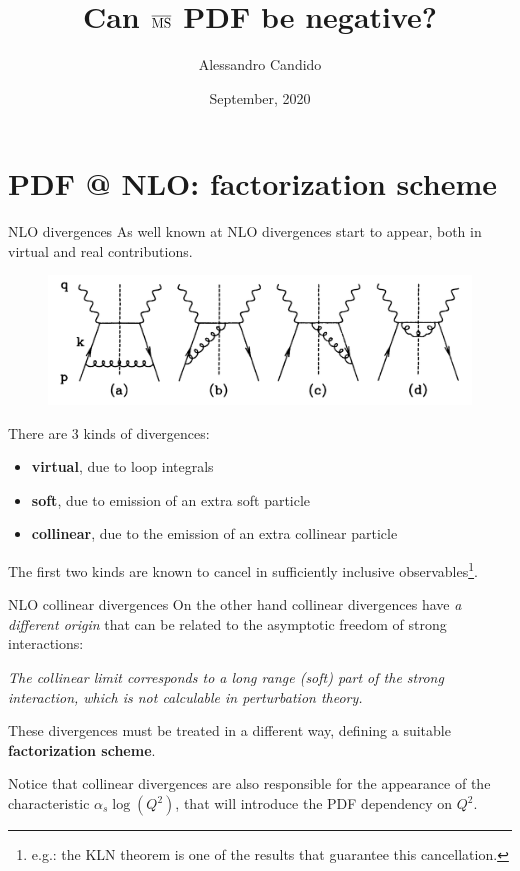 \documentclass[8pt]{beamer}
\title{Can $\operatorname{\overline{MS}}$ PDF be negative?}
\date{September, 2020}
\author{Alessandro Candido
}
\begin{document}
\maketitle

\section{PDF @ NLO: factorization scheme}
\begin{frame}{NLO divergences}
    As well known at NLO divergences start to appear, both in virtual and real contributions.
    \begin{figure}
        \centering
        \includegraphics[width=.8\textwidth]{pictures/nlo-real}
    \end{figure}
    There are 3 kinds of divergences:
    \begin{itemize}
        \item \textbf{virtual}, due to loop integrals
        \item \textbf{soft}, due to emission of an extra soft particle
        \item \textbf{collinear}, due to the emission of an extra collinear particle
    \end{itemize}
    The first two kinds are known to cancel in sufficiently inclusive
    observables\footnote{e.g.: the KLN theorem is one of the results that guarantee
    this cancellation.}.
\end{frame}

\begin{frame}{NLO collinear divergences}
    On the other hand collinear divergences have \textit{a different origin}
    that can be related to the asymptotic freedom of strong interactions:

    \begin{center}
        \textit{The collinear limit corresponds to a long range (soft) part of
        the strong interaction, which is not calculable in perturbation
        theory.}
    \end{center}

    These divergences must be treated in a different way, defining a suitable
    \textbf{factorization scheme}.\newline

    Notice that collinear divergences are also responsible for the appearance
    of the characteristic $\alpha_s \log(Q^2)$, that will introduce the PDF
    dependency on $Q^2$.
\end{frame}
\end{document}
